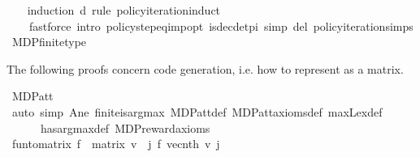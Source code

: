 \begin{isabellebody}
\isadelimproof
\ \ %
\endisadelimproof
%
\isatagproof
{}\isamarkupfalse%
\ {\isacharparenleft}{\kern0pt}induction\ d\ rule{\isacharcolon}{\kern0pt}\ policy{\isacharunderscore}{\kern0pt}iteration{\isachardot}{\kern0pt}induct{\isacharparenright}{\kern0pt}\isanewline
\ \ \ \ {\isacharparenleft}{\kern0pt}fastforce\ intro{\isacharbang}{\kern0pt}{\isacharcolon}{\kern0pt}\ policy{\isacharunderscore}{\kern0pt}step{\isacharunderscore}{\kern0pt}eq{\isacharunderscore}{\kern0pt}imp{\isacharunderscore}{\kern0pt}opt\ is{\isacharunderscore}{\kern0pt}dec{\isacharunderscore}{\kern0pt}det{\isacharunderscore}{\kern0pt}pi{\isacharprime}{\kern0pt}\ simp\ del{\isacharcolon}{\kern0pt}\ policy{\isacharunderscore}{\kern0pt}iteration{\isachardot}{\kern0pt}simps{\isacharparenright}{\kern0pt}%
\endisatagproof
{\isafoldproof}%
%
\isadelimproof
\isanewline
%
\endisadelimproof
{}\isamarkupfalse%
\isanewline
\isanewline
{}\isamarkupfalse%
\ MDP{\isacharunderscore}{\kern0pt}finite{\isacharunderscore}{\kern0pt}type\ %
\begin{isamarkuptext}%
The following proofs concern code generation, i.e. how to represent  as a matrix.%
\end{isamarkuptext}\isamarkuptrue%
\isamarkupfalse%
\ MDP{\isacharunderscore}{\kern0pt}att{\isacharunderscore}{\kern0pt}{\isasymL}\isanewline
%
\isadelimproof
\ \ %
\endisadelimproof
%
\isatagproof
{}\isamarkupfalse%
\ {\isacharparenleft}{\kern0pt}auto\ simp{\isacharcolon}{\kern0pt}\ A{\isacharunderscore}{\kern0pt}ne\ finite{\isacharunderscore}{\kern0pt}is{\isacharunderscore}{\kern0pt}arg{\isacharunderscore}{\kern0pt}max\ MDP{\isacharunderscore}{\kern0pt}att{\isacharunderscore}{\kern0pt}{\isasymL}{\isacharunderscore}{\kern0pt}def\ MDP{\isacharunderscore}{\kern0pt}att{\isacharunderscore}{\kern0pt}{\isasymL}{\isacharunderscore}{\kern0pt}axioms{\isacharunderscore}{\kern0pt}def\ max{\isacharunderscore}{\kern0pt}L{\isacharunderscore}{\kern0pt}ex{\isacharunderscore}{\kern0pt}def\ \isanewline
\ \ \ \ \ \ has{\isacharunderscore}{\kern0pt}arg{\isacharunderscore}{\kern0pt}max{\isacharunderscore}{\kern0pt}def\ MDP{\isacharunderscore}{\kern0pt}reward{\isacharunderscore}{\kern0pt}axioms{\isacharparenright}{\kern0pt}%
\endisatagproof
{\isafoldproof}%
%
\isadelimproof
\ \isanewline
%
\endisadelimproof
\isanewline
{}\isamarkupfalse%
\ {\isachardoublequoteopen}fun{\isacharunderscore}{\kern0pt}to{\isacharunderscore}{\kern0pt}matrix\ f\ {\isacharequal}{\kern0pt}\ matrix\ {\isacharparenleft}{\kern0pt}{\isasymlambda}v{\isachardot}{\kern0pt}\ {\isacharparenleft}{\kern0pt}{\isasymchi}\ j{\isachardot}{\kern0pt}\ f\ {\isacharparenleft}{\kern0pt}vec{\isacharunderscore}{\kern0pt}nth\ v{\isacharparenright}{\kern0pt}\ j{\isacharparenright}{\kern0pt}{\isacharparenright}{\kern0pt}{\isachardoublequoteclose}\isanewline

\end{isabellebody}
